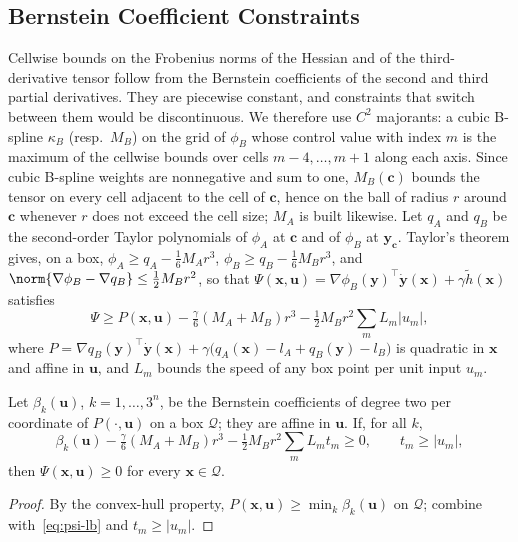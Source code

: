 \subsection{Bernstein Coefficient Constraints}
Cellwise bounds on the Frobenius norms of the Hessian and of the third-derivative tensor follow from
the Bernstein coefficients of the second and third partial derivatives. They are piecewise
constant, and constraints that switch between them would be discontinuous. We therefore use $C^2$
majorants: a cubic B-spline $\kappa_B$ (resp.\ $M_B$) on the grid of $\phi_B$ whose control value
with index $m$ is the maximum of the cellwise bounds over cells $m-4,\dots,m+1$ along each axis.
Since cubic B-spline weights are nonnegative and sum to one, $M_B(\mathbf c)$ bounds the tensor on
every cell adjacent to the cell of $\mathbf c$, hence on the ball of radius $r$ around $\mathbf c$
whenever $r$ does not exceed the cell size; $M_A$ is built likewise. Let $q_A$ and $q_B$ be the
second-order Taylor polynomials of $\phi_A$ at $\mathbf c$ and of $\phi_B$ at $\mathbf y_{\mathbf c}$.
Taylor's theorem gives, on a box,
$\phi_A\ge q_A-\tfrac16M_Ar^3$, $\phi_B\ge q_B-\tfrac16M_Br^3$, and
$\norm{\nabla\phi_B-\nabla q_B}\le\tfrac12M_Br^2$, so that
$\Psi(\mathbf x,\mathbf u)=\nabla\phi_B(\mathbf y)^\top\dot{\mathbf y}(\mathbf x)+\gamma\tilde h(\mathbf x)$
satisfies
\begin{equation}\label{eq:psi-lb}
\Psi\ge P(\mathbf x,\mathbf u)-\tfrac\gamma6(M_A+M_B)r^3-\tfrac12M_Br^2\textstyle\sum_mL_m|u_m| ,
\end{equation}
where $P=\nabla q_B(\mathbf y)^\top\dot{\mathbf y}(\mathbf x)+\gamma\big(q_A(\mathbf x)-l_A+q_B(\mathbf
y)-l_B\big)$ is quadratic in $\mathbf x$ and affine in $\mathbf u$, and $L_m$ bounds the speed of any box
point per unit input $u_m$.
\begin{proposition}\label{prop:coef}
Let $\beta_k(\mathbf u)$, $k=1,\dots,3^n$, be the Bernstein coefficients of degree two per coordinate
of $P(\cdot,\mathbf u)$ on a box $\mathcal Q$; they are affine in $\mathbf u$. If, for all $k$,
\begin{equation}\label{eq:coef}
\beta_k(\mathbf u)-\tfrac\gamma6(M_A+M_B)r^3-\tfrac12M_Br^2\textstyle\sum_mL_mt_m\ge0,\qquad t_m\ge|u_m|,
\end{equation}
then $\Psi(\mathbf x,\mathbf u)\ge0$ for every $\mathbf x\in\mathcal Q$.
\end{proposition}
\begin{proof}
By the convex-hull property, $P(\mathbf x,\mathbf u)\ge\min_k\beta_k(\mathbf u)$ on $\mathcal Q$;
combine with~\eqref{eq:psi-lb} and $t_m\ge|u_m|$.
\end{proof}
